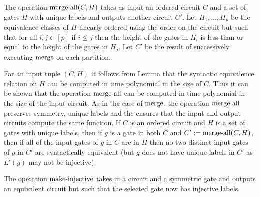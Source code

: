 \documentclass[../paper.tex]{subfiles}
\begin{document}
\begin{definition}
  The operation $\text{\upshape merge-all}(C, H)$ takes as input an ordered circuit $C$ and
  a set of gates $H$ with unique labels and outputs another circuit $C'$. Let
  $H_1, \ldots, H_p$ be the equivalence classes of $H$ linearly ordered using
  the order on the circuit but such that for all $i, j \in [p]$ if $i \leq j$
  then the height of the gates in $H_i$ is less than or equal to the height of
  the gates in $H_j$. Let $C'$ be the result of successively executing
  $\text{\upshape merge}$ on each partition.
\end{definition}

For an input tuple $(C, H)$ it follows from Lemma \cite{} that the syntactic
equivalence relation on $H$ can be computed in time polynomial in the size of
$C$. Thus it can be shown that the operation $\text{\upshape merge-all}$ can be computed in
time polynomial in the size of the input circuit. As in the case of
$\text{\upshape merge}$, the operation $\text{\upshape merge-all}$ preserves symmetry, unique labels
and the ensures that the input and output circuits compute the same function. If
$C$ is an ordered circuit and $H$ is a set of gates with unique labels, then if
$g$ is a gate in both $C$ and $C' := \text{\upshape merge-all}(C, H)$, then if all of the input
gates of $g$ in $C$ are in $H$ then no two distinct input gates of $g$ in $C'$
are syntactically equivalent (but $g$ does not have unique labels in $C'$ as
$L'(g)$ may not be injective). 


The operation $\text{\upshape make-injective}$ takes in a circuit and a symmetric gate and
outputs an equivalent circuit but such that the selected gate now has injective
labels.
\end{document}
